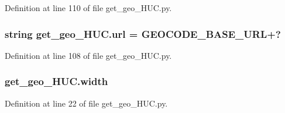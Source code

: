 Definition at line 110 of file get\+\_\+geo\+\_\+\+H\+U\+C.\+py.

\subsubsection[{\texorpdfstring{url}{url}}]{\setlength{\rightskip}{0pt plus 5cm}string get\+\_\+geo\+\_\+\+H\+U\+C.\+url = {\bf G\+E\+O\+C\+O\+D\+E\+\_\+\+B\+A\+S\+E\+\_\+\+U\+RL}+\textquotesingle{}?\textquotesingle{}}\hypertarget{namespaceget__geo___h_u_c_ab6098a8720c14d3cf3f34a3301c2ca93}{}\label{namespaceget__geo___h_u_c_ab6098a8720c14d3cf3f34a3301c2ca93}


Definition at line 108 of file get\+\_\+geo\+\_\+\+H\+U\+C.\+py.

\subsubsection[{\texorpdfstring{width}{width}}]{\setlength{\rightskip}{0pt plus 5cm}get\+\_\+geo\+\_\+\+H\+U\+C.\+width}\hypertarget{namespaceget__geo___h_u_c_ad4f932dfe1b13e5124bc8be92dfb1f07}{}\label{namespaceget__geo___h_u_c_ad4f932dfe1b13e5124bc8be92dfb1f07}


Definition at line 22 of file get\+\_\+geo\+\_\+\+H\+U\+C.\+py.

